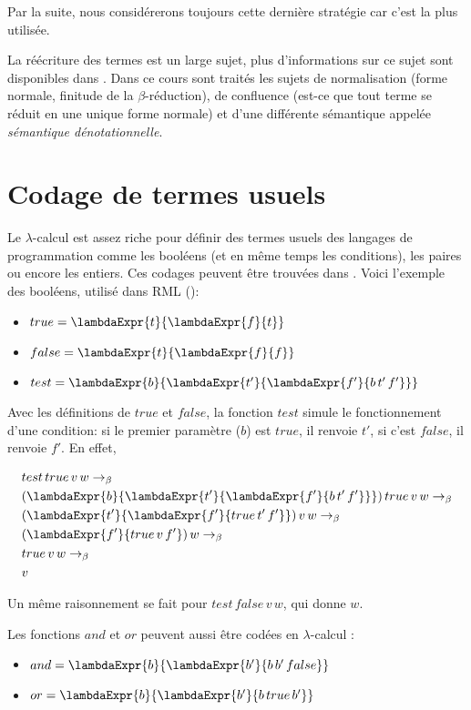 Par la suite, nous considérerons toujours cette dernière stratégie car c'est la
plus utilisée.

La réécriture des termes est un large sujet, plus d'informations sur ce sujet
sont disponibles dans \cite{ENS-Cachan-cours-lambda-calcul}.
Dans ce cours sont traités les sujets de normalisation (forme normale, finitude
de la $\beta$-réduction), de confluence (est-ce que tout terme se réduit en une
unique forme normale) et d'une différente sémantique appelée \textit{sémantique
dénotationnelle}.

\section{Codage de termes usuels}

Le $\lambda$-calcul est assez riche pour définir des
termes usuels des langages de programmation comme les booléens (et en même temps les
conditions), les paires ou encore les entiers. Ces codages peuvent être trouvées
dans \cite{tapl-untyped-lambda-calculus}. Voici l'exemple des booléens, utilisé dans RML (\cite{rml-github}):

\begin{itemize}
  \item $true = \lambdaExpr{t}{\lambdaExpr{f}{t}}$
  \item $false = \lambdaExpr{t}{\lambdaExpr{f}{f}}$
  \item $test = \lambdaExpr{b}{\lambdaExpr{t'}{\lambdaExpr{f'}{b \, t' \, f'}}}$
\end{itemize}

Avec les définitions de $true$ et $false$, la fonction $test$ simule le fonctionnement d'une condition: si le premier
paramètre ($b$) est $true$, il renvoie $t'$, si c'est $false$, il renvoie
$f'$. En effet,

\begin{align*}
  & test \, true \, v \, w \rightarrow_{\beta} \\
  & (\lambdaExpr{b}{\lambdaExpr{t'}{\lambdaExpr{f'}{b \, t' \, f'}}}) \, true \, v \, w \rightarrow_{\beta} \\
  & (\lambdaExpr{t'}{\lambdaExpr{f'}{true \, t' \, f'}}) \, v \, w \rightarrow_{\beta} \\
  & (\lambdaExpr{f'}{true \, v \, f'}) \, w \rightarrow_{\beta} \\
  & true \, v \, w \rightarrow_{\beta} \\
  & v
\end{align*}

Un même raisonnement se fait pour $test \, false \, v \, w$, qui donne $w$.

Les fonctions $and$ et $or$ peuvent aussi être codées en
$\lambda$-calcul :

\begin{itemize}
  \item $and = \lambdaExpr{b}{\lambdaExpr{b'}{b \, b' \, false}}$
  \item $or = \lambdaExpr{b}{\lambdaExpr{b'}{b \, true \, b'}}$
\end{itemize}
